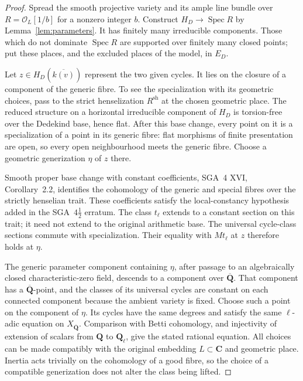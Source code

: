 \documentclass[11pt]{article}
\theoremstyle{definition}
\theoremstyle{remark}
\newcommand{\Q}{\mathbf Q}
\newcommand{\C}{\mathbf C}
\newcommand{\Qbar}{\overline{\mathbf Q}}
\newcommand{\Spec}{\operatorname{Spec}}
\begin{document}
\begin{proof}
Spread the smooth projective variety and its ample line bundle over $R=\mathcal O_L[1/b]$ for a nonzero integer $b$. Construct $H_D\to\Spec R$ by Lemma~\ref{lem:parameters}. It has finitely many irreducible components. Those which do not dominate $\Spec R$ are supported over finitely many closed points; put these places, and the excluded places of the model, in $E_D$.

Let $z\in H_D(\overline{k(v)})$ represent the two given cycles. It lies on the closure of a component of the generic fibre. To see the specialization with its geometric choices, pass to the strict henselization $R^{\mathrm{sh}}$ at the chosen geometric place. The reduced structure on a horizontal irreducible component of $H_D$ is torsion-free over the Dedekind base, hence flat. After this base change, every point on it is a specialization of a point in its generic fibre: flat morphisms of finite presentation are open, so every open neighbourhood meets the generic fibre. Choose a geometric generization $\eta$ of $z$ there.

Smooth proper base change with constant coefficients, SGA~4 XVI, Corollary~2.2, identifies the cohomology of the generic and special fibres over the strictly henselian trait. These coefficients satisfy the local-constancy hypothesis added in the SGA~$4\frac12$ erratum. The class $t_\ell$ extends to a constant section on this trait; it need not extend to the original arithmetic base. The universal cycle-class sections commute with specialization. Their equality with $Mt_\ell$ at $z$ therefore holds at $\eta$.

The generic parameter component containing $\eta$, after passage to an algebraically closed characteristic-zero field, descends to a component over $\Qbar$. That component has a $\Qbar$-point, and the classes of its universal cycles are constant on each connected component because the ambient variety is fixed. Choose such a point on the component of $\eta$. Its cycles have the same degrees and satisfy the same $\ell$-adic equation on $X_{\Qbar}$. Comparison with Betti cohomology, and injectivity of extension of scalars from $\Q$ to $\Q_\ell$, give the stated rational equation. All choices can be made compatibly with the original embedding $L\subset\C$ and geometric place. Inertia acts trivially on the cohomology of a good fibre, so the choice of a compatible generization does not alter the class being lifted.
\end{proof}
\end{document}
